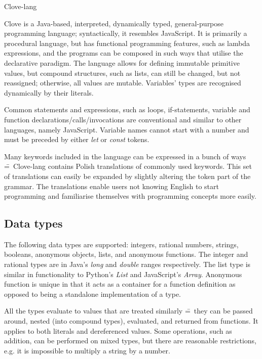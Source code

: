 \documentclass[12pt,a4paper]{article}
\begin{document}
\begin{center}
  \Huge {Clove-lang}
\end{center}

\noindent Clove is a Java-based, interpreted, dynamically typed, general-purpose programming language; syntactically, it resembles JavaScript. It is primarily a procedural language, but has functional programming features, such as lambda expressions, and the programs can be composed in such ways that utilise the declarative paradigm. The language allows for defining immutable primitive values, but compound structures, such as lists, can still be changed, but not reassigned; otherwise, all values are mutable. Variables' types are recognised dynamically by their literals.\par

Common statements and expressions, such as loops, if-statements, variable and function declarations/calls/invocations are conventional and similar to other languages, namely JavaScript. Variable names cannot start with a number and must be preceded by either \emph{let} or \emph{const} tokens.\par

Many keywords included in the language can be expressed in a bunch of ways \==~Clove-lang contains Polish translations of commonly used keywords. This set of translations can easily be expanded by slightly altering the token part of the grammar. The translations enable users not knowing English to start programming and familiarise themselves with programming concepts more easily.



\subsection*{Data types}
The following data types are supported: integers, rational numbers, strings, booleans, anonymous objects, lists, and anonymous functions. The integer and rational types are in Java's \emph{long} and \emph{double} ranges respectively. The list type is similar in functionality to Python's \emph{List} and JavaScript's \emph{Array}. Anonymous function is unique in that it acts as a container for a function definition as opposed to being a standalone implementation of a type.\par

All the types evaluate to values that are treated similarly \==~they can be passed around, nested (into compound types), evaluated, and returned from functions. It applies to both literals and dereferenced values. Some operations, such as addition, can be performed on mixed types, but there are reasonable restrictions, e.g. it is impossible to multiply a string by a number.
\end{document}
